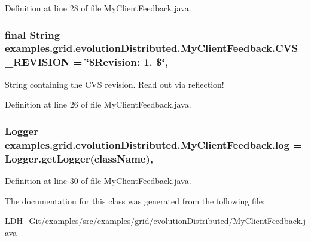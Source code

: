 Definition at line 28 of file My\-Client\-Feedback.\-java.

\hypertarget{classexamples_1_1grid_1_1evolution_distributed_1_1_my_client_feedback_aee26440f17bcdfdc43c2a0de40b3f5b8}{
\subsubsection[{C\-V\-S\-\_\-\-R\-E\-V\-I\-S\-I\-O\-N}]{\setlength{\rightskip}{0pt plus 5cm}final String examples.\-grid.\-evolution\-Distributed.\-My\-Client\-Feedback.\-C\-V\-S\-\_\-\-R\-E\-V\-I\-S\-I\-O\-N = \char`\"{}\$Revision\-: 1. \$\char`\"{}\hspace{0.3cm}{\ttfamily [static]}, {\ttfamily [private]}}}\label{classexamples_1_1grid_1_1evolution_distributed_1_1_my_client_feedback_aee26440f17bcdfdc43c2a0de40b3f5b8}
String containing the C\-V\-S revision. Read out via reflection! 

Definition at line 26 of file My\-Client\-Feedback.\-java.

\hypertarget{classexamples_1_1grid_1_1evolution_distributed_1_1_my_client_feedback_aadfb14d2934948a2dd6d419817769f4d}{
\subsubsection[{log}]{\setlength{\rightskip}{0pt plus 5cm}Logger examples.\-grid.\-evolution\-Distributed.\-My\-Client\-Feedback.\-log = Logger.\-get\-Logger({\bf class\-Name})\hspace{0.3cm}{\ttfamily [static]}, {\ttfamily [private]}}}\label{classexamples_1_1grid_1_1evolution_distributed_1_1_my_client_feedback_aadfb14d2934948a2dd6d419817769f4d}


Definition at line 30 of file My\-Client\-Feedback.\-java.



The documentation for this class was generated from the following file\-:\begin{DoxyCompactItemize}
\item 
L\-D\-H\-\_\-\-Git/examples/src/examples/grid/evolution\-Distributed/\hyperlink{evolution_distributed_2_my_client_feedback_8java}{My\-Client\-Feedback.\-java}\end{DoxyCompactItemize}
